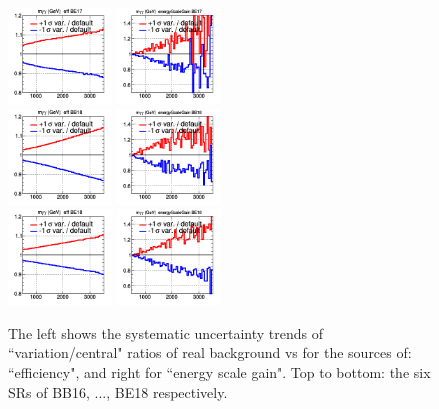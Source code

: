 \begin{figure}[!htbp]
\includegraphics[width=0.24\linewidth, height=1in]{fig/spectra__eff_BE17_ADDGRW.png}
\includegraphics[width=0.24\linewidth, height=1in]{fig/spectra__energyScaleGain_BE17_ADDGRW.png}\\
\includegraphics[width=0.24\linewidth, height=1in]{fig/spectra__eff_BB18_ADDGRW.png}
\includegraphics[width=0.24\linewidth, height=1in]{fig/spectra__energyScaleGain_BB18_ADDGRW.png}\\
\includegraphics[width=0.24\linewidth, height=1in]{fig/spectra__eff_BE18_ADDGRW.png}
\includegraphics[width=0.24\linewidth, height=1in]{fig/spectra__energyScaleGain_BE18_ADDGRW.png}
\caption{The left shows the systematic uncertainty trends of ``variation/central" ratios of real \gmgm background vs \mgg for the sources of: ``efficiency", and right for ``energy scale gain". Top to bottom: the six SRs of BB16, ..., BE18 respectively.}
\label{fig:E_scale_sys}
\end{figure}







\newpage
% 
% 
